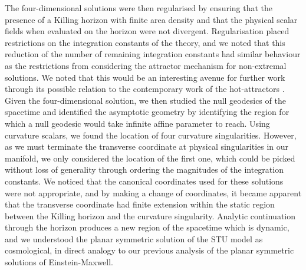 The four-dimensional solutions were then regularised by ensuring that the presence of a Killing horizon with finite area density and that the physical scalar fields when evaluated on the horizon were not divergent. Regularisation placed restrictions on the integration constants of the theory, and we noted that this reduction of the number of remaining integration constants had similar behaviour as the restrictions from considering the attractor mechanism for non-extremal solutions. We noted that this would be an interesting avenue for further work through its possible relation to the contemporary work of the hot-attractors \cite{Goldstein:2014gta, Goldstein:2018mwt} . Given the four-dimensional solution, we then studied the null geodesics of the spacetime and identified the asymptotic geometry by identifying the region for which a null geodesic would take infinite affine parameter to reach. Using curvature scalars, we found the location of four curvature singularities. However, as we must terminate the transverse coordinate at physical singularities in our manifold, we only considered the location of the first one, which could be picked without loss of generality through ordering the magnitudes of the integration constants. We noticed that the canonical coordinates used for these solutions were not appropriate, and by making a change of coordinates, it became apparent that the transverse coordinate had finite extension within the static region between the Killing horizon and the curvature singularity. Analytic continuation through the horizon produces a new region of the spacetime which is dynamic, and we understood the planar symmetric solution of the STU model as cosmological, in direct analogy to our previous analysis of the planar symmetric solutions of Einstein-Maxwell.

